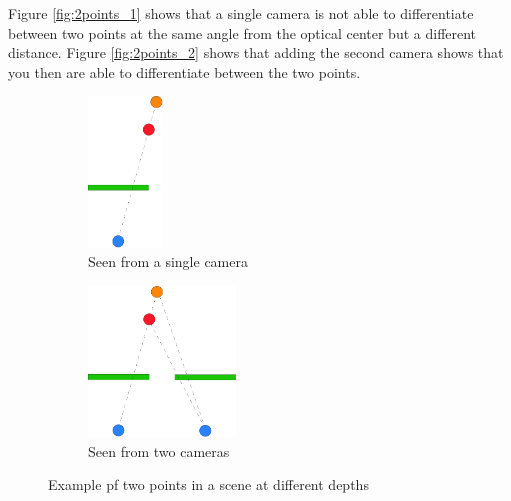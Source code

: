 Figure \vref{fig:2points_1} shows that a single camera is not able to differentiate between two points at the same angle from the optical center but a different distance. Figure \vref{fig:2points_2} shows that adding the second camera shows that you then are able to differentiate between the two points.

\begin{figure}[ht]
  \centering
  \begin{subfigure}[t]{0.45\textwidth}
    \centering\includegraphics[height=4cm]{figures/2points_1}
    \caption{Seen from a single camera\label{fig:2points_1}}
  \end{subfigure}
  \begin{subfigure}[t]{0.45\textwidth}
    \centering\includegraphics[height=4cm]{figures/2points_2}
    \caption{Seen from two cameras\label{fig:2points_2}}
  \end{subfigure}
  \caption{Example pf two points in a scene at different depths\label{fig:2points_all}}
\end{figure}

